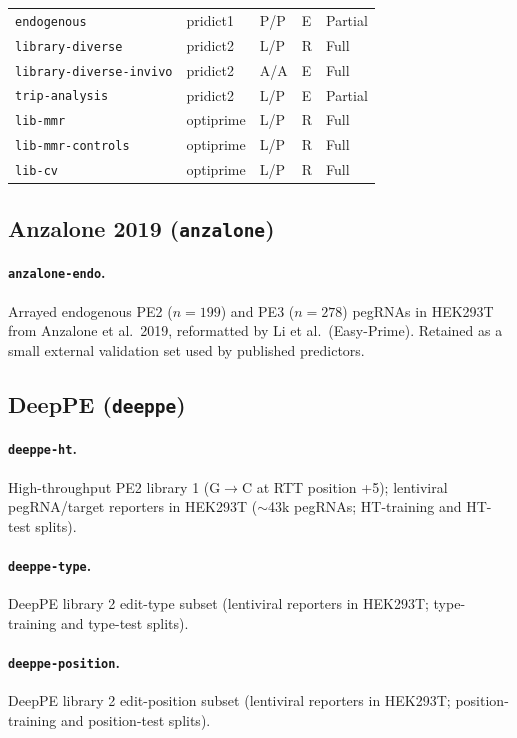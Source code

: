 \documentclass{article}
\begin{document}
\begin{longtable}{@{}>{\raggedright\arraybackslash}p{}>{\raggedright\arraybackslash}p{}p{}p{}>{\raggedright\arraybackslash}p{}@{}}
    \nolinkurl{endogenous} & pridict1 & P/P & E & Partial \\
    \nolinkurl{library-diverse} & pridict2 & L/P & R & Full \\
    \nolinkurl{library-diverse-invivo} & pridict2 & A/A & E & Full \\
    \nolinkurl{trip-analysis} & pridict2 & L/P & E & Partial \\
    \nolinkurl{lib-mmr} & optiprime & L/P & R & Full \\
    \nolinkurl{lib-mmr-controls} & optiprime & L/P & R & Full \\
    \nolinkurl{lib-cv} & optiprime & L/P & R & Full \\
\end{longtable}
\endgroup

\subsection{Anzalone 2019 (\texorpdfstring{\nolinkurl{anzalone}}{anzalone})}

\paragraph{\nolinkurl{anzalone-endo}.}
Arrayed endogenous PE2 ($n = 199$) and PE3 ($n = 278$) pegRNAs in HEK293T from Anzalone et al.\ 2019, reformatted by Li et al.\ (Easy-Prime). Retained as a small external validation set used by published predictors.

\subsection{DeepPE (\texorpdfstring{\nolinkurl{deeppe}}{deeppe})}

\paragraph{\nolinkurl{deeppe-ht}.}
High-throughput PE2 library 1 (G$\to$C at RTT position +5); lentiviral pegRNA/target reporters in HEK293T (${\sim}$43k pegRNAs; HT-training and HT-test splits).

\paragraph{\nolinkurl{deeppe-type}.}
DeepPE library 2 edit-type subset (lentiviral reporters in HEK293T; type-training and type-test splits).

\paragraph{\nolinkurl{deeppe-position}.}
DeepPE library 2 edit-position subset (lentiviral reporters in HEK293T; position-training and position-test splits).
\end{document}

